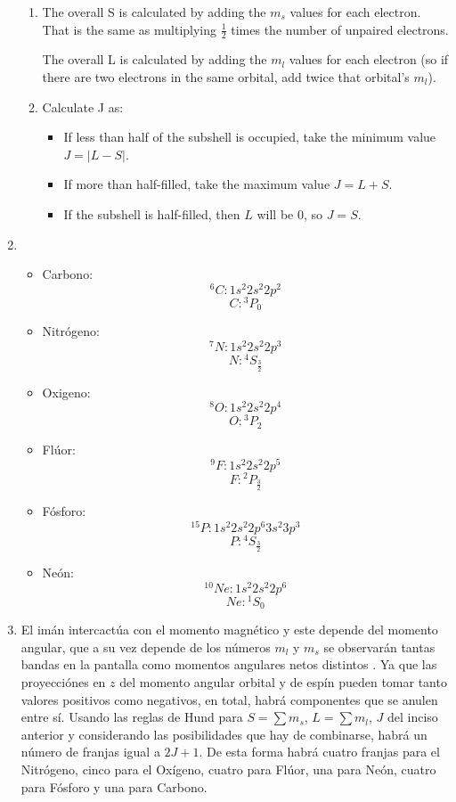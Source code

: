 \documentclass{article}
\begin{document}
\begin{enumerate}
\begin{enumerate}
\item The overall S is calculated by adding the $m_s$ values for each electron. That is the same as multiplying $\frac{1}{2}$
 times the number of unpaired electrons. 

The overall L is calculated by adding the $m_l$ values for each electron (so if there are two electrons in the same orbital, add twice that orbital's $m_l$).

\item Calculate J as: \begin{itemize}
\item If less than half of the subshell is occupied, take the minimum value $J = |L - S|$.
\item If more than half-filled, take the maximum value $J = L + S$.
\item If the subshell is half-filled, then $L$ will be 0, so $J = S$.
\end{itemize}
\end{enumerate}
\item \begin{itemize}
\item Carbono: $${^6C: 1s^2 2s^2 2p^2}$$ $$C: {^3}P_0$$
\item Nitrógeno: $${^7}N: 1s^2 2s^2 2p^3$$ $$N: {^4}S_\frac{3}{2}$$
\item Oxigeno: $${^8}O: 1s^2 2s^2 2p^4$$ $$O: {^3}P_2$$
\item Flúor: $${^9}F:1s^2 2s^2 2p^5$$ $$F: {^2}P_\frac{3}{2}$$
\item Fósforo: $${^{15}}P: 1s^2 2s^2 2p^6 3s^2 3p^3$$ $$P:{^4}S_\frac{3}{2}$$
\item Neón: $${^{10}}Ne: 1s^2 2s^2 2p^6$$ $$Ne:{^1}S_0$$
\end{itemize}

\item El imán intercactúa con el momento magnético y este depende del momento angular, que a su vez depende de los números $m_l$ y $m_s$ se observarán tantas bandas en la pantalla como momentos angulares netos distintos . Ya que las proyecciónes en $z$ del momento angular orbital y de espín pueden tomar tanto valores positivos como negativos, en total, habrá componentes que se anulen entre sí. Usando las reglas de Hund para $S=\sum m_s$, $L= \sum m_l$, $J$ del inciso anterior  y considerando las posibilidades que hay de combinarse, habrá un número de franjas igual a $2J+1$. De esta forma habrá cuatro franjas para el Nitrógeno, cinco para el Oxígeno, cuatro para Flúor, una para Neón, cuatro para Fósforo y una para Carbono.


\end{enumerate}
\end{document}
